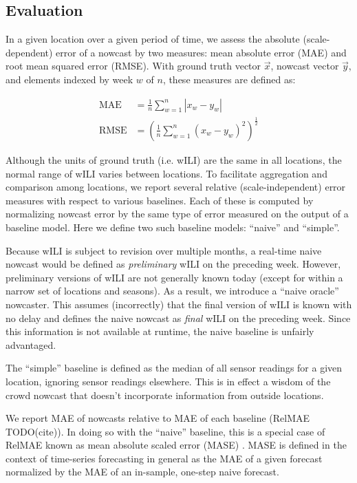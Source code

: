 \documentclass[10pt,letterpaper]{article}
\begin{document}
\subsection*{Evaluation}

In a given location over a given period of time, we assess the absolute
(scale-dependent) error of a nowcast by two measures: mean absolute error (MAE)
and root mean squared error (RMSE). With ground truth vector $\vec{x}$, nowcast
vector $\vec{y}$, and elements indexed by week $w$ of $n$, these measures are
defined as:

\begin{align*}
  \text{MAE} &= \frac{1}{n} \sum_{w=1}^n{\left|x_w - y_w\right|} \\
  \text{RMSE} &= \left( \frac{1}{n} \sum_{w=1}^n{\left(x_w - y_w\right)^2} \right)^\frac{1}{2}
\end{align*}

Although the units of ground truth (i.e. wILI) are the same in all locations,
the normal range of wILI varies between locations. To facilitate aggregation
and comparison among locations, we report several relative (scale-independent)
error measures with respect to various baselines. Each of these is computed by
normalizing nowcast error by the same type of error measured on the output of a
baseline model. Here we define two such baseline models: ``naive'' and
``simple''.

Because wILI is subject to revision over multiple months, a real-time naive
nowcast would be defined as \textit{preliminary} wILI on the preceding week.
However, preliminary versions of wILI are not generally known today (except for
within a narrow set of locations and seasons). As a result, we introduce a
``naive oracle'' nowcaster. This assumes (incorrectly) that the final version
of wILI is known with no delay and defines the naive nowcast as \textit{final}
wILI on the preceding week. Since this information is not available at runtime,
the naive baseline is unfairly advantaged.

The ``simple'' baseline is defined as the median of all sensor readings for a
given location, ignoring sensor readings elsewhere. This is in effect a wisdom
of the crowd nowcast that doesn't incorporate information from outside
locations.

We report MAE of nowcasts relative to MAE of each baseline (RelMAE TODO(cite)).
In doing so with the ``naive'' baseline, this is a special case of RelMAE known
as mean absolute scaled error (MASE) \cite{hyndman2006another}. MASE is defined
in the context of time-series forecasting in general as the MAE of a given
forecast normalized by the MAE of an in-sample, one-step naive forecast.
\end{document}
